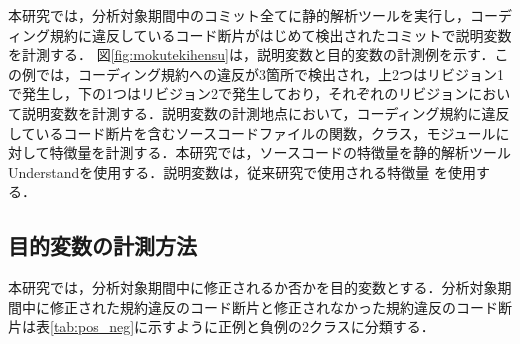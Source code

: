 \documentclass[T,J]{fose} %
\newcommand{\todo}[1]{\colorbox{yellow}{{\bf TODO}:}{\color{red} {\textbf{[#1]}}}}
\begin{document}
本研究では，分析対象期間中のコミット全てに静的解析ツールを実行し，コーディング規約に違反しているコード断片がはじめて検出されたコミットで説明変数を計測する．
図\ref{fig:mokutekihensu}は，説明変数と目的変数の計測例を示す．この例では，コーディング規約への違反が3箇所で検出され，上2つはリビジョン1で発生し，下の1つはリビジョン2で発生しており，それぞれのリビジョンにおいて説明変数を計測する．説明変数の計測地点において，コーディング規約に違反しているコード断片を含むソースコードファイルの関数，クラス，モジュールに対して特徴量を計測する．本研究では，ソースコードの特徴量を静的解析ツールUnderstandを使用する．説明変数は，従来研究で使用される特徴量
を使用する．

\subsection{目的変数の計測方法}

本研究では，分析対象期間中に修正されるか否かを目的変数とする．分析対象期間中に修正された規約違反のコード断片と修正されなかった規約違反のコード断片は表\ref{tab:pos_neg}に示すように正例と負例の2クラスに分類する．

\begin{table}[t]
    \centering
    \caption{正例と負例の分類}
    \label{tab:pos_neg}
\end{table}

\end{document}

